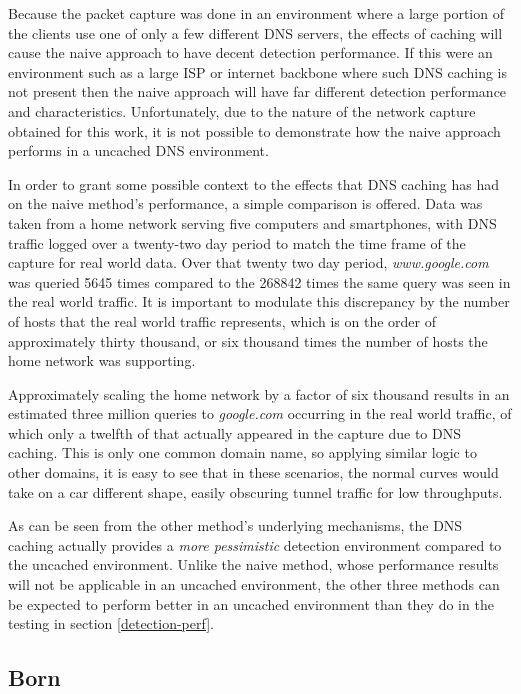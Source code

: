 \documentclass[12pt]{report}
\theoremstyle{remark}
\theoremstyle{definition}
\theoremstyle{definition}
\theoremstyle{definition}
\begin{document}
Because the packet capture was done in an environment where a large portion of
the clients use one of only a few different DNS servers, the effects of caching
will cause the naive approach to have decent detection performance. If this were
an environment such as a large ISP or internet backbone where such DNS caching
is not present then the naive approach will have far different detection
performance and characteristics. Unfortunately, due to the nature of the network
capture obtained for this work, it is not possible to demonstrate how the naive
approach performs in a uncached DNS environment.

In order to grant some possible context to the effects that DNS caching has had
on the naive method's performance, a simple comparison is offered. Data was
taken from a home network serving five computers and smartphones, with DNS
traffic logged over a twenty-two day period to match the time frame of the
capture for real world data. Over that twenty two day period,
\emph{www.google.com} was queried 5645 times compared to the 268842 times the
same query was seen in the real world traffic. It is important to modulate this
discrepancy by the number of hosts that the real world traffic represents, which
is on the order of approximately thirty thousand, or six thousand times the
number of hosts the home network was supporting.

Approximately scaling the home network by a factor of six thousand results in an
estimated three million queries to \emph{google.com} occurring in the real world
traffic, of which only a twelfth of that actually appeared in the capture due to
DNS caching. This is only one common domain name, so applying similar logic to
other domains, it is easy to see that in these scenarios, the normal curves
would take on a car different shape, easily obscuring tunnel traffic for low
throughputs.

As can be seen from the other method's underlying mechanisms, the DNS caching
actually provides a \emph{more pessimistic} detection environment compared to
the uncached environment. Unlike the naive method, whose performance results
will not be applicable in an uncached environment, the other three methods can
be expected to perform better in an uncached environment than they do in the
testing in section \ref{detection-perf}.

\subsection{Born}
\end{document}
